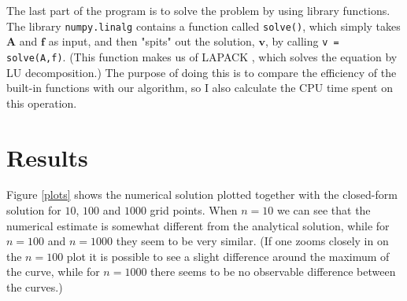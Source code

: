 \documentclass[12pt, a4paper]{article}
\begin{document}
The last part of the program is to solve the problem by using library functions. The library 
\texttt{numpy.linalg} \cite{numpy.linalg} contains a function called \texttt{solve()}, which simply takes 
$\mathbf{A}$ and $\mathbf{f}$ as input, and then "spits" out the solution, $\mathbf{v}$, by calling 
\texttt{v = solve(A,f)}. (This function makes us of LAPACK \cite{LAPACK}, which solves the equation by 
LU decomposition.) The purpose of doing this is to compare the efficiency of 
the built-in functions with our algorithm, so I also calculate the CPU time spent on this operation. 


\section{Results}

Figure \ref{plots} shows the numerical solution plotted together with the closed-form solution for 
$10$, $100$ and $1000$ grid points. When $n=10$ we can see that the numerical estimate is somewhat 
different from the analytical solution, while for $n=100$ and $n=1000$ they seem to be very similar. 
(If one zooms closely in on the $n=100$ plot it is possible to see a slight difference around the 
maximum of the curve, while for $n=1000$ there seems to be no observable difference between the curves.) 
\end{document}
